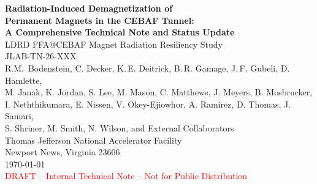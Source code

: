 \documentclass[11pt,letterpaper]{article}
\begin{document}
\begin{titlepage}
\centering
\vspace*{2cm}
{\huge\bfseries Radiation-Induced Demagnetization of\\
Permanent Magnets in the CEBAF Tunnel:\\[6pt]
A Comprehensive Technical Note and Status Update}\\[1.5cm]
{\Large LDRD FFA@CEBAF Magnet Radiation Resiliency Study\\JLAB-TN-26-XXX}\\[2cm]
{\large R.M.\ Bodenstein, C. Decker, K.\,E. Deitrick, B.\,R. Gamage, J.\,F. Gubeli, D. Hamlette,\\ M. Janak, K. Jordan, S. Lee, M. Mason, C. Matthews, J. Meyers, B. Mosbrucker,\\ I. Neththikumara,  E. Nissen, V. Okey-Ejiowhor, A. Ramirez, D. Thomas, J. Samari,\\ S. Shriner, M. Smith, N. Wilson, and External Collaborators}\\[2.5cm]
{\large Thomas Jefferson National Accelerator Facility}\\[0.5cm]
{\large Newport News, Virginia 23606}\\[3cm]
{\large\today}\\[1.5cm]
{\large\textcolor{red}{DRAFT -- Internal Technical Note -- Not for Public Distribution}}\\[2cm]


\end{titlepage}
\end{document}
